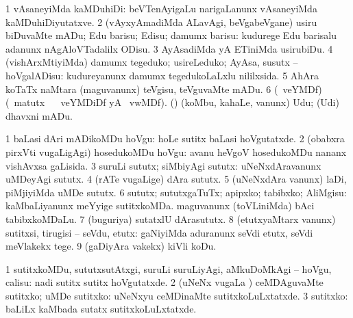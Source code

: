 \bentry
{}
\gl{\sakirx}
\bmng
\bnum
\num{1} vAsaneyiMda kaMDuhiDi:  beVTenAyigaLu narigaLanunx vAsaneyiMda kaMDuhiDiyutatxve. 
\num{2} (vAyxyAmadiMda ALavAgi, beVgabeVgane) usiru biDuvaMte mADu; Edu barisu; Edisu; damumx barisu:  kudurege Edu barisalu adanunx nAgAloVTadalilx ODisu. 
\num{3} AyAsadiMda yA ETiniMda usirubiDu. 
\num{4} (vishArxMtiyiMda) damumx tegeduko; usireLeduko; AyAsa, susutx -- hoVgalADisu:  kudureyanunx damumx tegedukoLaLxlu nililxsida. 
\num{5} AhAra koTaTx naMtara (maguvanunx) teVgisu, teVguvaMte mADu. 
\num{6} (\ucAcx\ veYMDf) (\BU\ matutx \BUkaq\  \ucAcx\ veYMDiDf yA  \ucAcx\ vwMDf). (\kAparx) (koMbu, kahaLe, \mo vanunx) Udu; (Udi) dhavxni mADu. 
\enum
\emng
\eentry

\bentry
{}
\gl{\sakirx}
\bmng
\bnum
\num{1} baLasi dAri mADikoMDu hoVgu:  hoLe sutitx baLasi hoVgutatxde. 
\num{2} (obabxra pirxVti \mo vugaLigAgi) hosedukoMDu hoVgu:  avanu heVgoV hosedukoMDu nananx vishAvxsa gaLisida. 
\num{3} suruLi sututx; siMbiyAgi sututx:  uNeNxdAravanunx uMDeyAgi sututx. 
\num{4} (rATe \mo vugaLige) dAra sututx. 
\num{5} (uNeNxdAra \mo vanunx) laDi, piMjiyiMda uMDe sututx. 
\num{6} sututx; sututxgaTuTx; apipxko; tabibxko; AliMgisu:  kaMbaLiyanunx meYyige sutitxkoMDa.  maguvanunx (toVLiniMda) bAci tabibxkoMDaLu. 
\num{7} (buguriya) sutatxlU dArasututx. 
\num{8} (etutxyaMtarx \mo vanunx) sutitxsi, tirugisi -- seVdu, etutx:  gaNiyiMda aduranunx seVdi etutx, seVdi meVlakekx tege. 
\num{9} (gaDiyAra \mo vakekx) kiVli koDu. 
\enum
\emng

\noindent
\gl{\akirx}
\bmng
\bnum
\num{1} sutitxkoMDu, sututxsutAtxgi, suruLi suruLiyAgi, aMkuDoMkAgi -- hoVgu, calisu:  nadi sutitx sutitx hoVgutatxde. 
\num{2} (uNeNx \mo vugaLa \vi) ceMDAguvaMte sutitxko; uMDe sutitxko:  uNeNxyu ceMDinaMte sutitxkoLuLxtatxde. 
\num{3} sutitxko:  baLiLx kaMbada sutatx sutitxkoLuLxtatxde. 
\enum
\emng

